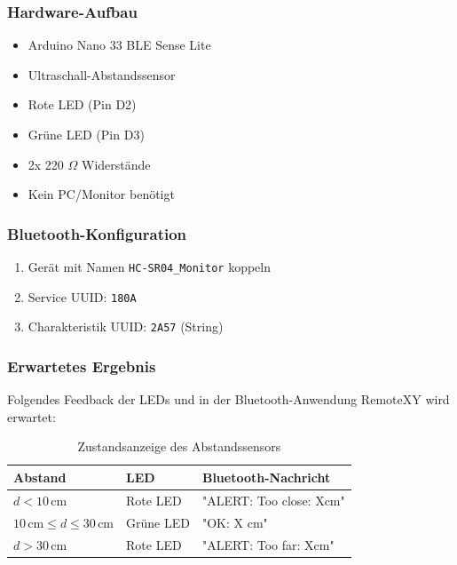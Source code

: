 {
}

\subsubsection{Hardware-Aufbau}
\begin{itemize}
	\item Arduino Nano 33 BLE Sense Lite
	\item Ultraschall-Abstandssensor
	\item Rote LED (Pin D2)
	\item Grüne LED (Pin D3) 
	\item 2x 220 $\Omega$ Widerstände
	\item Kein PC/Monitor benötigt
\end{itemize}

\subsubsection{Bluetooth-Konfiguration}
\begin{enumerate}
	\item Gerät mit Namen \texttt{HC-SR04\_Monitor} koppeln
	\item Service UUID: \texttt{180A}
	\item Charakteristik UUID: \texttt{2A57} (String)
\end{enumerate}

\subsubsection{Erwartetes Ergebnis}
Folgendes Feedback der LEDs und in der Bluetooth-Anwendung RemoteXY wird erwartet:

\begin{table}[h]
	\centering
	\renewcommand{\arraystretch}{1.5}
	\setlength{\tabcolsep}{10pt}
	\caption{Zustandsanzeige des Abstandssensors}
	\label{tab:abstandsanzeige}
	\begin{tabular}{|m{4cm}|m{3cm}|m{5cm}|}
		\hline 
		\rowcolor{gray!20}\textbf{Abstand} & \textbf{LED} & \textbf{Bluetooth-Nachricht} \\ \hline
		$d < 10\,\text{cm}$ & Rote LED & "ALERT: Too close: Xcm" \\ \hline
		$10\,\text{cm} \leq d \leq 30\,\text{cm}$ & Grüne LED & "OK: X cm" \\ \hline
		$d > 30\,\text{cm}$ & Rote LED & "ALERT: Too far: Xcm" \\ \hline
	\end{tabular}
\end{table}

